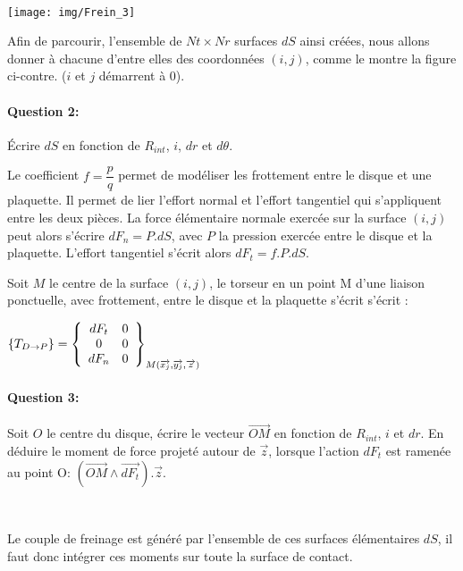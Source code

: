 ~\

\begin{minipage}{0.47\linewidth}
 \centering\texttt{[image: img/Frein\_3]}
\end{minipage}\hfill
\begin{minipage}{0.47\linewidth}
Afin de parcourir, l'ensemble de $Nt\times Nr$ surfaces $dS$ ainsi créées, nous allons donner à chacune d'entre elles des coordonnées $(i,j)$, comme le montre la figure ci-contre. ($i$ et $j$ démarrent à $0$).

\paragraph{Question 2:} Écrire $dS$ en fonction de $R_{int}$, $i$, $dr$ et $d\theta$.
\end{minipage}

Le coefficient $f=\dfrac{p}{q}$ permet de modéliser les frottement entre le disque et une plaquette. Il permet de lier l'effort normal et l'effort tangentiel qui s'appliquent entre les deux pièces. La force élémentaire normale exercée sur la surface $(i,j)$ peut alors s'écrire $dF_n=P.dS$, avec $P$ la pression exercée entre le disque et la plaquette. L'effort tangentiel s'écrit alors $dF_t=f.P.dS$.

Soit $M$ le centre de la surface $(i,j)$, le torseur en un point M d'une liaison ponctuelle, avec frottement, entre le disque et la plaquette s'écrit s'écrit :

$\left\{T_{D\rightarrow P}\right\}=\left\{\begin{array}{c c}
dF_t & 0 \\ 0 & 0 \\ dF_n & 0
\end{array}\right\}_{M(\overrightarrow{x_j},\overrightarrow{y_j},\overrightarrow{z})}$

\paragraph{Question 3:} Soit $O$ le centre du disque, écrire le vecteur $\overrightarrow{OM}$ en fonction de $R_{int}$, $i$ et $dr$. En déduire le moment de force projeté autour de $\overrightarrow{z}$, lorsque l'action $dF_t$ est ramenée au point O: $(\overrightarrow{OM}\wedge \overrightarrow{dF_t}).\overrightarrow{z}$.

~\

Le couple de freinage est généré par l'ensemble de ces surfaces élémentaires $dS$, il faut donc intégrer ces moments sur toute la surface de contact.

